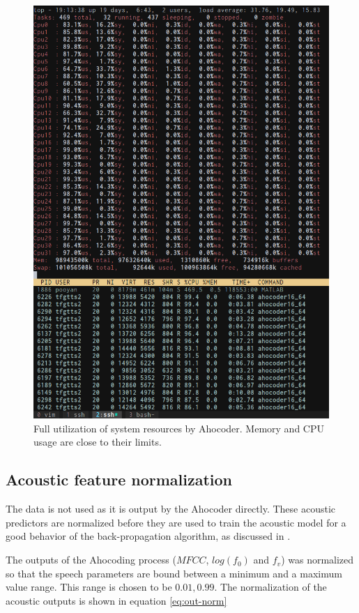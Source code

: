 \begin{figure}
    \centering
    \includegraphics[width=15cm]{figures/ahoload}
    \caption{Full utilization of system resources by Ahocoder. Memory and CPU usage are close to their limits.}
    \label{fig:aho-load}
\end{figure}

\subsection{Acoustic feature normalization}

The data is not used as it is output by the Ahocoder directly. These acoustic predictors are normalized before they are used to train the acoustic model for a good behavior of the back-propagation algorithm, as discussed in \cite{pascual2016deep}.

The outputs of the Ahocoding process ($MFCC$, $log(f_0)$ and $f_v$) was normalized so that the speech parameters are bound between a minimum and a maximum value range. This range is chosen to be ${0.01, 0.99}$. The normalization of the acoustic outputs is shown in equation \ref{eq:out-norm}

